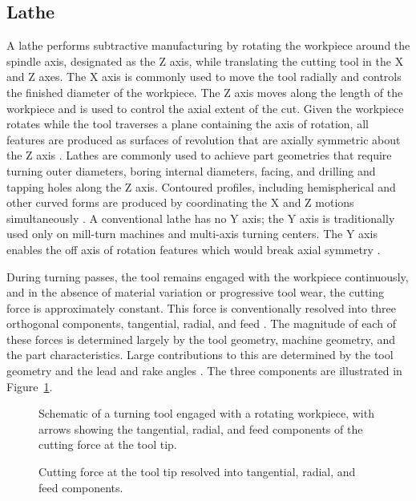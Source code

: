 \subsection{Lathe}\label{Sect:lathe}
A lathe performs subtractive manufacturing by rotating the workpiece around the spindle axis, designated as the Z axis, while translating the cutting tool in the X and Z axes. The X axis is commonly used to move the tool radially and controls the finished diameter of the workpiece. The Z axis moves along the length of the workpiece and is used to control the axial extent of the cut. Given the workpiece rotates while the tool traverses a plane containing the axis of rotation, all features are produced as surfaces of revolution that are axially symmetric about the Z axis \cite{altintas_manufacturing_2012}. Lathes are commonly used to achieve part geometries that require turning outer diameters, boring internal diameters, facing, and drilling and tapping holes along the Z axis. Contoured profiles, including hemispherical and other curved forms are produced by coordinating the X and Z motions simultaneously \cite{groover_fundamentals_2010}. A conventional lathe has no Y axis; the Y axis is traditionally used only on mill-turn machines and multi-axis turning centers. The Y axis enables the off axis of rotation features which would break axial symmetry \cite{moriwaki_multi-functional_2008}.

During turning passes, the tool remains engaged with the workpiece continuously, and in the absence of material variation or progressive tool wear, the cutting force is approximately constant. This force is conventionally resolved into three orthogonal components, tangential, radial, and feed \cite{altintas_manufacturing_2012}. The magnitude of each of these forces is determined largely by the tool geometry, machine geometry, and the part characteristics. Large contributions to this are determined by the tool geometry and the lead and rake angles \cite{altintas_manufacturing_2012}. The three components are illustrated in Figure~\ref{fig:cutting_forces}.
\begin{figure}[htbp]
	\centering
		{Schematic of a turning tool engaged with a rotating workpiece, with arrows showing the tangential, radial, and feed components of the cutting force at the tool tip.}
	\caption[Cutting force components in turning]{Cutting force at the tool tip resolved into tangential, radial, and feed components.}
	\label{fig:cutting_forces}
\end{figure}



